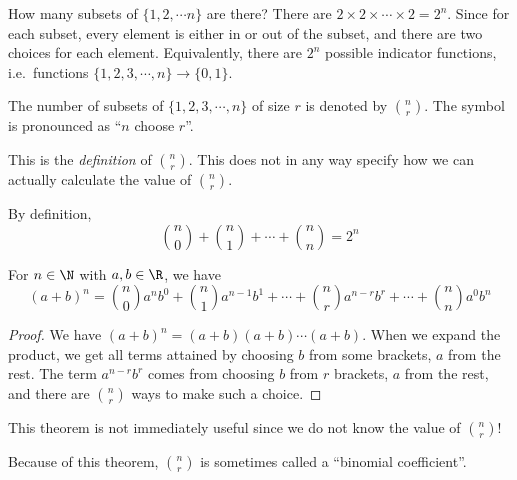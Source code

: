 \documentclass[a4paper]{article}
\begin{document}
\begin{eg}
  How many subsets of $\{1, 2, \cdots n\}$ are there? There are $2\times 2\times \cdots \times 2 = 2^n$. Since for each subset, every element is either in or out of the subset, and there are two choices for each element. Equivalently, there are $2^n$ possible indicator functions, i.e.\ functions $\{1, 2, 3, \cdots, n\} \to \{0, 1\}$.
\end{eg}

\begin{defi}
  The number of subsets of $\{1, 2, 3, \cdots, n\}$ of size $r$ is denoted by $\binom{n}{r}$. The symbol is pronounced as ``$n$ choose $r$''.
\end{defi}
This is the \emph{definition} of $\binom{n}{r}$. This does not in any way specify how we can actually calculate the value of $\binom{n}{r}$.

\begin{prop}
  By definition,
  \[
    \binom{n}{0} + \binom{n}{1} + \cdots + \binom{n}{n} = 2^n
  \]
\end{prop}

\begin{thm}
  For $n\in \N$ with $a, b\in \R$, we have
  \[
    (a + b)^n = \binom{n}{0}a^n b^0 + \binom{n}{1}a^{n-1}b^1 + \cdots + \binom{n}{r}a^{n - r}b^r + \cdots + \binom{n}{n}a^0b^n
  \]
\end{thm}

\begin{proof}
  We have $(a + b)^n = (a + b)(a + b)\cdots (a + b)$. When we expand the product, we get all terms attained by choosing $b$ from some brackets, $a$ from the rest. The term $a^{n - r}b^r$ comes from choosing $b$ from $r$ brackets, $a$ from the rest, and there are $\binom{n}{r}$ ways to make such a choice.
\end{proof}
This theorem is not immediately useful since we do not know the value of $\binom{n }{r}$!

Because of this theorem, $\binom{n }{r}$ is sometimes called a ``binomial coefficient''.
\end{document}
